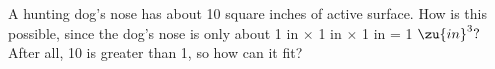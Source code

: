 A hunting dog's nose has about 10 square inches of active
surface. How is this possible, since the dog's nose is only
about 1 in $\times$ 1 in $\times$ 1 in = 1 $\zu{in}^3?$ After all, 10 is
greater than 1, so how can it fit?
